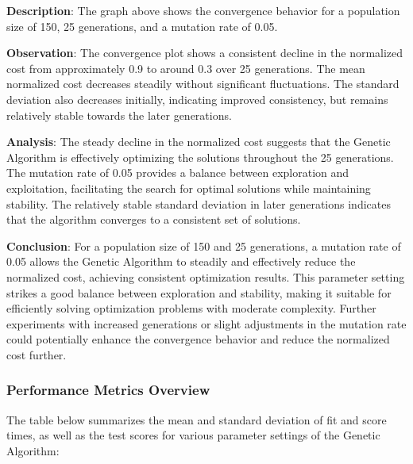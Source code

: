 \documentclass{article}
\begin{document}
    \textbf{Description}: The graph above shows the convergence behavior for a population size of 150, 25 generations, and a mutation rate of 0.05.

    \textbf{Observation}: The convergence plot shows a consistent decline in the normalized cost from approximately 0.9 to around 0.3 over 25 generations. The mean normalized cost decreases steadily without significant fluctuations. The standard deviation also decreases initially, indicating improved consistency, but remains relatively stable towards the later generations.

    \textbf{Analysis}: The steady decline in the normalized cost suggests that the Genetic Algorithm is effectively optimizing the solutions throughout the 25 generations. The mutation rate of 0.05 provides a balance between exploration and exploitation, facilitating the search for optimal solutions while maintaining stability. The relatively stable standard deviation in later generations indicates that the algorithm converges to a consistent set of solutions.

    \textbf{Conclusion}: For a population size of 150 and 25 generations, a mutation rate of 0.05 allows the Genetic Algorithm to steadily and effectively reduce the normalized cost, achieving consistent optimization results. This parameter setting strikes a good balance between exploration and stability, making it suitable for efficiently solving optimization problems with moderate complexity. Further experiments with increased generations or slight adjustments in the mutation rate could potentially enhance the convergence behavior and reduce the normalized cost further.

    \subsubsection{Performance Metrics Overview}

    The table below summarizes the mean and standard deviation of fit and score times, as well as the test scores for various parameter settings of the Genetic Algorithm:
\end{document}
